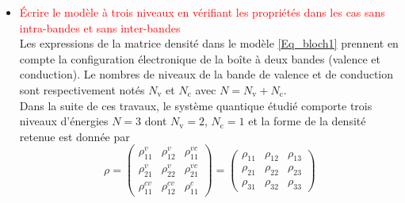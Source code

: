 \documentclass[a4paper]{article}
\newcommand{\rc}{\mathrm{c}}
\newcommand{\rv}{\mathrm{v}}
\begin{document}
\begin{itemize}
\item \textcolor{red}{Écrire le modèle à trois niveaux en vérifiant les propriétés dans les cas sans intra-bandes et sans inter-bandes}
\\Les expressions de la matrice densité  dans le modèle \eqref{Eq_bloch1} prennent en compte la configuration électronique de la boîte à deux bandes (valence et conduction). Le nombres de niveaux de la bande de valence et de conduction sont respectivement notés $N_{\rv}$ et $N_{\rc}$ avec $N=N_{\rv} +N_{\rc}$.
\\ Dans la suite de ces travaux, le système quantique étudié comporte trois niveaux d'énergies $N=3$ dont $N_{\rv}=2$, $N_{\rc}=1$ et la forme de la densité retenue est donnée par 
\begin{equation*}
\rho=\begin{pmatrix}
\rho_{11}^{v} & \rho_{12}^{v} & \rho_{11}^{vc} \\
\rho_{21}^{v} & \rho_{22}^{v} & \rho_{21}^{vc} \\
\rho_{11}^{cv} & \rho_{12}^{cv} & \rho_{11}^{c} 
\end{pmatrix} = \begin{pmatrix}
\rho_{11} & \rho_{12} & \rho_{13} \\
\rho_{21} & \rho_{22} & \rho_{23} \\
\rho_{31} & \rho_{32} & \rho_{33} 
\end{pmatrix}
\end{equation*}



\end{itemize}
\end{document}
